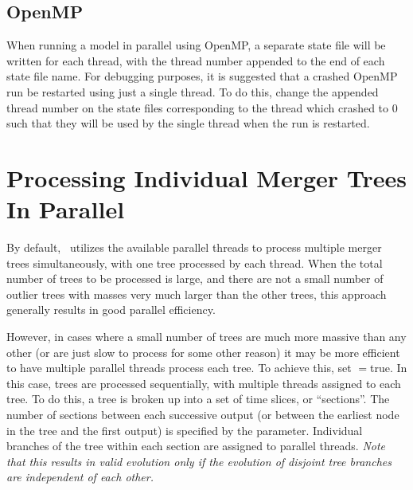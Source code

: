 \subsection{OpenMP}

When running a model in parallel using OpenMP, a separate state file will be written for each thread, with the thread number appended to the end of each state file name. For debugging purposes, it is suggested that a crashed OpenMP run be restarted using just a single thread. To do this, change the appended thread number on the state files corresponding to the thread which crashed to 0 such that they will be used by the single thread when the run is restarted.

\section{Processing Individual Merger Trees In Parallel}

By default, \glc\ utilizes the available parallel threads to process multiple merger trees simultaneously, with one tree processed by each thread. When the total number of trees to be processed is large, and there are not a small number of outlier trees with masses very much larger than the other trees, this approach generally results in good parallel efficiency.

However, in cases where a small number of trees are much more massive than any other (or are just slow to process for some other reason) it may be more efficient to have multiple parallel threads process each tree. To achieve this, set {\normalfont \ttfamily [treeEvolveSingleForest]}$=${\normalfont \ttfamily true}. In this case, trees are processed sequentially, with multiple threads assigned to each tree. To do this, a tree is broken up into a set of time slices, or ``sections''. The number of sections between each successive output (or between the earliest node in the tree and the first output) is specified by the {\normalfont \ttfamily [treeEvolveSingleForestSections]} parameter. Individual branches of the tree within each section are assigned to parallel threads. \emph{Note that this results in valid evolution only if the evolution of disjoint tree branches are independent of each other.}
